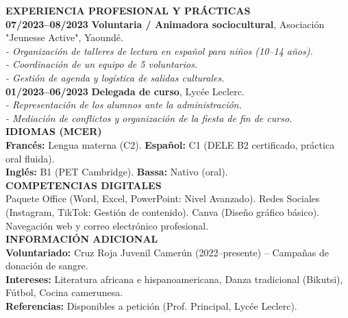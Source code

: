 \documentclass[11pt]{article}
\begin{document}
\begin{exoresolu}
\begin{textebox}
\textbf{EXPERIENCIA PROFESIONAL Y PRÁCTICAS} \\
\textbf{07/2023--08/2023} \quad \textbf{Voluntaria / Animadora sociocultural}, Asociación "Jeunesse Active", Yaoundé. \\
\quad \textit{- Organización de talleres de lectura en español para niños (10--14 años).} \\
\quad \textit{- Coordinación de un equipo de 5 voluntarios.} \\
\quad \textit{- Gestión de agenda y logística de salidas culturales.} \\
\textbf{01/2023--06/2023} \quad \textbf{Delegada de curso}, Lycée Leclerc. \\
\quad \textit{- Representación de los alumnos ante la administración.} \\
\quad \textit{- Mediación de conflictos y organización de la fiesta de fin de curso.} \\

\textbf{IDIOMAS (MCER)} \\
\textbf{Francés:} Lengua materna (C2). \quad \textbf{Español:} C1 (DELE B2 certificado, práctica oral fluida). \\
\textbf{Inglés:} B1 (PET Cambridge). \quad \textbf{Bassa:} Nativo (oral). \\

\textbf{COMPETENCIAS DIGITALES} \\
Paquete Office (Word, Excel, PowerPoint: Nivel Avanzado). Redes Sociales (Instagram, TikTok: Gestión de contenido). Canva (Diseño gráfico básico). Navegación web y correo electrónico profesional. \\

\textbf{INFORMACIÓN ADICIONAL} \\
\textbf{Voluntariado:} Cruz Roja Juvenil Camerún (2022--presente) -- Campañas de donación de sangre. \\
\textbf{Intereses:} Literatura africana e hispanoamericana, Danza tradicional (Bikutsi), Fútbol, Cocina camerunesa. \\
\textbf{Referencias:} Disponibles a petición (Prof. Principal, Lycée Leclerc).
\end{textebox}


\end{exoresolu}
\end{document}
